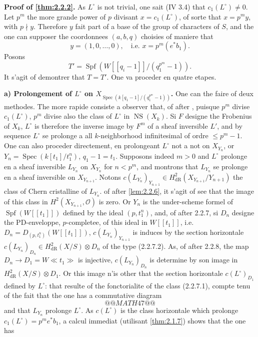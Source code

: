\documentclass[12pt,a4paper]{article}
\theoremstyle{plain}
\theoremstyle{definition}
\theoremstyle{remark}
\DeclareMathOperator{\Spec}{Spec}
\DeclareMathOperator{\Spf}{Spf}
\providecommand{\Spec}{\operatorname{Spec}}
\providecommand{\NS}{\operatorname{NS}}
\begin{document}
\subsubsection{}
\textbf{Proof of \ref{thm:2.2.2}.} As $L^\circ$ is not trivial, one sait (IV 3.4) that $c_1(L^\circ) \neq 0$. Let $p^m$ the more grande power of $p$ divisant $x = c_1(L^\circ)$, of sorte that $x = p^m y$, with $p \nmid y$. Therefore $y$ fait part of a base of the group of characters of $S$, and the one can supposer the coordonnees $(a, b, q)$ choisies of maniere that
\[
y = (1, 0, \ldots, 0), \quad \text{i.e. } x = p^m (e^* b_1).
\]
Posons
\[
T' = \Spf(W[[q_i - 1]]/(q_1^{p^m} - 1)).
\]
It s'agit of demontrer that $T = T'$. One va proceder en quatre etapes.

\textbf{a) Prolongement of $L^\circ$ on $X_{\Spec(k[q_1-1]/(q_1^{p^m}-1))}$.} One can the faire of deux methodes. The more rapide consiste a observer that, of after \cite[1.4]{Ogus1979}, puisque $p^m$ divise $c_1(L^\circ)$, $p^m$ divise also the class of $L^\circ$ in $\NS(X_k)$. Si $F$ designe the Frobenius of $X_k$, $L^\circ$ is therefore the inverse image by $F^m$ of a sheaf inversible $L'$, and by sequence $L^\circ$ se prolonge a all $k$-neighborhood infinitesimal of ordre $\leqslant p^m - 1$. One can also proceder directement, en prolongeant $L^\circ$ not a not on $X_{Y_n}$, or $Y_n = \Spec(k[t_1]/t_1^n)$, $q_1 - 1 = t_1$. Supposons indeed $m > 0$ and $L^\circ$ prolonge en a sheaf inversible $L_{Y_n}$ on $X_{Y_n}$ for $n < p^m$, and montrons that $L_{Y_n}$ se prolonge en a sheaf inversible on $X_{Y_{n+1}}$. Notons $c(L_{Y_n})_{Y_{n+1}} \in H^2_\mathrm{dR}(X_{Y_{n+1}}/Y_{n+1})$ the class of Chern cristalline of $L_{Y_n}$. of after \ref{lem:2.2.6}, it s'agit of see that the image of this class in $H^2(X_{Y_{n+1}}, \mathcal{O})$ is zero. Or $Y_n$ is the under-scheme formel of $\Spf(W[[t_1]])$ defined by the ideal $(p, t_1^n)$, and, of after 2.2.7, si $D_n$ designe the PD-enveloppe, $p$-completee, of this ideal in $W[[t_1]]$, i.e. $D_n = D_{(p, t_1^n)}(W[[t_1]])$, $c(L_{Y_n})_{Y_{n+1}}$ is induces by the section horizontale $c(L_{Y_n})_{D_n} \in H^2_\mathrm{dR}(X/S) \otimes D_n$ of the type (2.2.7.2). As, of after 2.2.8, the map $D_n \to D_1 = W\ll t_1 \gg$ is injective, $c(L_{Y_n})_{D_n}$ is determine by son image in $H^2_\mathrm{dR}(X/S) \otimes D_1$. Or this image n'is other that the section horizontale $c(L^\circ)_{D_1}$ defined by $L^\circ$: that resulte of the fonctorialite of the class (2.2.7.1), compte tenu of the fait that the one has a commutative diagram
\[
@@MATH47@@
\]
and that $L_{Y_n}$ prolonge $L^\circ$. As $c(L^\circ)$ is the class horizontale which prolonge $c_1(L^\circ) = p^m e^* b_1$, a calcul immediat (utilisant \ref{thm:2.1.7}) shows that the one has
\end{document}
